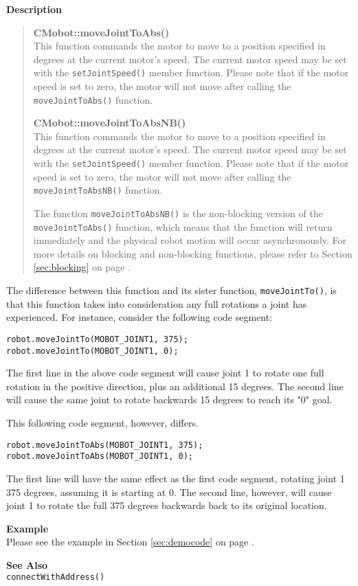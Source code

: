 \noindent
{\bf Description}\\
\vspace{-12pt}
\begin{quote}
{\bf CMobot::moveJointToAbs()}\\
This function commands the motor to move to a position specified in degrees at
the current motor's speed. The current motor speed may be set with the
\texttt{setJointSpeed()} member function. Please note that if the motor speed
is set to zero, the motor will not move after calling the
\texttt{moveJointToAbs()} function. 

{\bf CMobot::moveJointToAbsNB()}\\
This function commands the motor to move to a position specified in degrees at
the current motor's speed. The current motor speed may be set with the
\texttt{setJointSpeed()} member function. Please note that if the motor speed
is set to zero, the motor will not move after calling the
\texttt{moveJointToAbsNB()} function. 

The function \texttt{moveJointToAbsNB()} is the non-blocking version of
the \texttt{moveJointToAbs()} function, which means that the function will return
immediately and the physical robot motion will occur asynchronously. For
more details on blocking and non-blocking functions, please refer to 
Section \ref{sec:blocking} on page \pageref{sec:blocking}.\\
\end{quote}

The difference between this function and its sister function, \texttt{moveJointTo()},
is that this function takes into consideration any full rotations a joint has 
experienced. For instance, consider the following code segment:
\begin{verbatim}
robot.moveJointTo(MOBOT_JOINT1, 375);
robot.moveJointTo(MOBOT_JOINT1, 0);
\end{verbatim}
The first line in the above code segment will cause joint 1 to rotate one full
rotation in the positive direction, plus an additional 15 degrees. The second
line will cause the same joint to rotate backwards 15 degrees to reach its "0"
goal.

This following code segment, however, differs.
\begin{verbatim}
robot.moveJointToAbs(MOBOT_JOINT1, 375);
robot.moveJointToAbs(MOBOT_JOINT1, 0);
\end{verbatim}
The first line will have the same effect as the first code segment, rotating
joint 1 375 degrees, assuming it is starting at 0. The second line, however,
will cause joint 1 to rotate the full 375 degrees backwards back to its original 
location.

\noindent
{\bf Example}\\
Please see the example in Section \ref{sec:democode} on page \pageref{sec:democode}.\\
\noindent

\noindent
{\bf See Also}\\
\texttt{connectWithAddress()}

